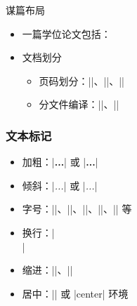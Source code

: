 \begin{frame}[fragile]{谋篇布局}
    \begin{itemize}
        \item 一篇学位论文包括：
        \item 文档划分
              \begin{itemize}
                  \item 页码划分：|\frontmatter|、|\mainmatter|、|\backmatter|
                  \item 分文件编译：||、||
              \end{itemize}
    \end{itemize}
\end{frame}

\begin{frame}[fragile]
    \frametitle{文本标记}
    \begin{itemize}
        \item 加粗：|{\bfseries ...}| 或 |\textbf{...}|
        \item 倾斜：|{\itshape ...}| 或 |\textit{...}|
        \item 字号：|\tiny|、|\small|、|\normalsize|、|\large|、|\huge| 等
        \item 换行：|\\|
        \item 缩进：|\indent|、|\noindent|
        \item 居中：|\centering| 或 |center| 环境
    \end{itemize}
\end{frame}


